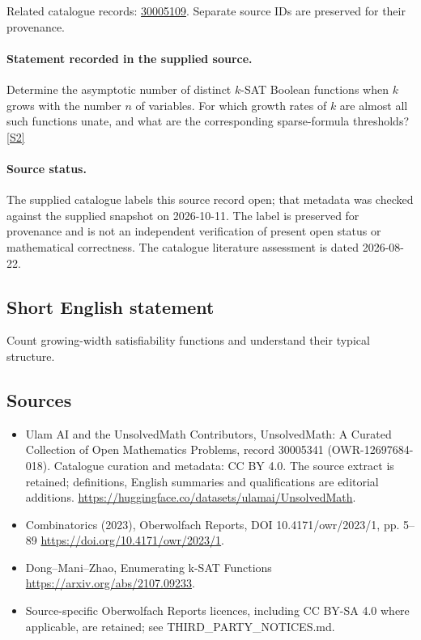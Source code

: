 \documentclass[11pt]{article}
\begin{document}
Related catalogue records: \href{https://mehmetmars7.github.io/Erdosproblems-llm-hunter/problem.html?type=open_problems&id=30005109}{30005109}. Separate source IDs are preserved for their provenance.
\paragraph{Statement recorded in the supplied source.}
Determine the asymptotic number of distinct $k$-SAT Boolean functions when $k$ grows with the number $n$ of variables. For which growth rates of $k$ are almost all such functions unate, and what are the corresponding sparse-formula thresholds? \href{https://doi.org/10.4171/owr/2023/1}{[S2]}
\paragraph{Source status.}
The supplied catalogue labels this source record open; that metadata was checked against the supplied snapshot on 2026-10-11. The label is preserved for provenance and is not an independent verification of present open status or mathematical correctness. The catalogue literature assessment is dated 2026-08-22.
\subsection{Short English statement}
Count growing-width satisfiability functions and understand their typical structure.
\subsection{Sources}
\begin{itemize}
\item[S1] Ulam AI and the UnsolvedMath Contributors, UnsolvedMath: A Curated Collection of Open Mathematics Problems, record 30005341 (OWR-12697684-018). Catalogue curation and metadata: CC BY 4.0. The source extract is retained; definitions, English summaries and qualifications are editorial additions.
\url{https://huggingface.co/datasets/ulamai/UnsolvedMath}.
\item[S2] Combinatorics (2023), Oberwolfach Reports, DOI 10.4171/owr/2023/1, pp. 5--89
\url{https://doi.org/10.4171/owr/2023/1}.
\item[S3] Dong--Mani--Zhao, Enumerating k-SAT Functions
\url{https://arxiv.org/abs/2107.09233}.
\item Source-specific Oberwolfach Reports licences, including CC BY-SA 4.0 where applicable, are retained; see THIRD\_PARTY\_NOTICES.md.
\end{itemize}
\end{document}
